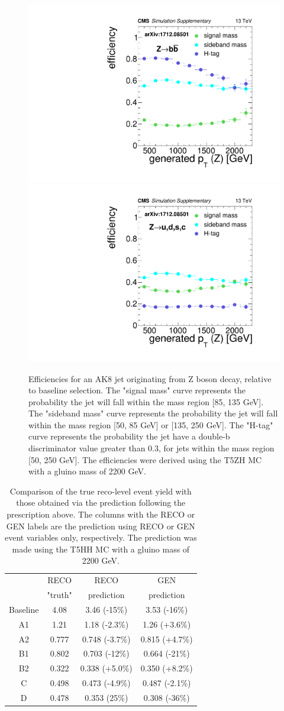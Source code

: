 \begin{figure}[hbp!]
\centering
\includegraphics[width=0.45\linewidth]{figs/CMS-SUS-17-006_Figure-aux_011.pdf}
\includegraphics[width=0.45\linewidth]{figs/CMS-SUS-17-006_Figure-aux_012.pdf}
\caption{
Efficiencies for an AK8 jet originating from Z boson decay, relative to baseline selection.
The "signal mass" curve represents the probability the jet will fall within the mass region [85, 135 GeV].
The "sideband mass" curve represents the probability the jet will fall within the mass region [50, 85 GeV] or [135, 250 GeV].
The "H-tag" curve represents the probability the jet have a double-b discriminator value greater than 0.3, for jets within the mass region [50, 250 GeV].
The efficiencies were derived using the T5ZH MC with a gluino mass of 2200 GeV.
}
\label{fig:effZ}
\end{figure}

\begin{table}[hbp!]
\centering
\caption{
Comparison of the true reco-level event yield with those obtained via the prediction following the prescription above.
The columns with the RECO or GEN labels are the prediction using RECO or GEN event variables only, respectively.
The prediction was made using the T5HH MC with a gluino mass of 2200 GeV.
}
\begin{tabular}{c | c c c}
\hline\hline
         & RECO     & RECO           & GEN\\
         & "truth"  & prediction     & prediction\\
\hline
Baseline & 4.08     & 3.46 (-15\%)   & 3.53 (-16\%)\\
A1       & 1.21     & 1.18 (-2.3\%)  & 1.26 (+3.6\%)\\
A2       & 0.777    & 0.748 (-3.7\%) & 0.815 (+4.7\%)\\
B1       & 0.802    & 0.703 (-12\%)  & 0.664 (-21\%)\\
B2       & 0.322    & 0.338 (+5.0\%) & 0.350 (+8.2\%)\\
C        & 0.498    & 0.473 (-4.9\%) & 0.487 (-2.1\%)\\
D        & 0.478    & 0.353 (25\%)   & 0.308 (-36\%)\\
\hline\hline
\end{tabular}
\label{tab:predclos}
\end{table}


